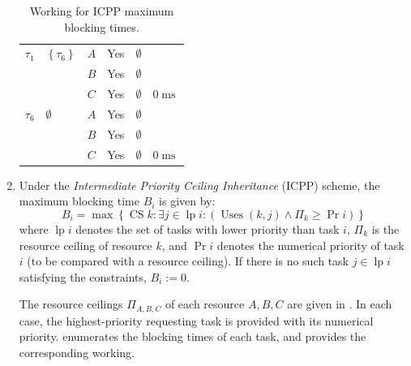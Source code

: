 \documentclass{article}
\numberwithin{equation}{section}
\numberwithin{table}{section}
\numberwithin{figure}{section}
\DeclareMathOperator\mls{ms}
\DeclareMathOperator\lp{lp}
\DeclareMathOperator\cs{CS}
\DeclareMathOperator\uses{Uses}
\begin{document}
\begin{enumerate}
\begin{table}[p]
\begin{tabular}{llllll}
                \midrule
                $\tau_1$ & $\left\{ \tau_6 \right\}$ & $A$ & Yes &
                    $\emptyset$ \\
                & & $B$ & Yes & $\emptyset$ \\
                & & $C$ & Yes & $\emptyset$ & $0\mls$ \\
                \midrule
                $\tau_6$ & $\emptyset$ & $A$ & Yes & $\emptyset$ \\
                & & $B$ & Yes & $\emptyset$ \\
                & & $C$ & Yes & $\emptyset$ & $0\mls$ \\
                \bottomrule
            \end{tabular}
            \caption{Working for ICPP maximum blocking times.}%
            \label{table:icpp-working}
        \end{table}
    \item Under the \emph{Intermediate Priority Ceiling Inheritance} (ICPP)
        scheme, the maximum blocking time $B_i$ is given
        by:
        \begin{equation}
            B_i = \max\left\{ \cs{k} \colon \exists j \in \lp{i} \colon \left(
                \uses(k, j) \land \Pi_k \geq \Pr i \right) \right\}
            \label{eqn:icpp-max-blocking}
        \end{equation}
        where $\lp{i}$ denotes the set of tasks with lower priority than task
        $i$, $\Pi_k$ is the resource ceiling of resource $k$, and $\Pr i$
        denotes the numerical priority of task $i$ (to be compared with a
        resource ceiling). If there is no such task $j \in \lp{i}$ satisfying
        the constraints, $B_i := 0$.
        
        The resource ceilings $\Pi_{A,B,C}$ of each resource $A,B,C$ are given
        in . In each case, the highest-priority
        requesting task is provided with its numerical priority.
         enumerates the blocking times of each task,
        and  provides the corresponding working.
        

\end{enumerate}
\end{document}
